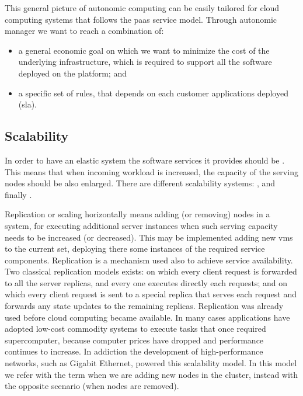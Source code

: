 This general picture of autonomic computing can be easily tailored for cloud computing systems that
follows the \ac{paas} service model. Through autonomic manager we want to reach a combination of:

\begin{itemize}
	\item{a general economic goal on which we want to minimize the cost of the underlying infrastructure,
		which is required to support all the software deployed on the platform; and}
	\item{a specific set of rules, that depends on each customer applications deployed (\ac{sla}).}
\end{itemize}

\subsection{Scalability}
\label{sec:elasticity-requirements-scalability}
In order to have an elastic system the software services it provides should be . This
means that when incoming workload is increased, the capacity of the serving nodes should be also
enlarged. There are different scalability systems: ,  and
finally .

Replication or scaling horizontally means adding (or removing) nodes in a system, for executing additional
server instances when such serving capacity needs to be increased (or decreased). This may be implemented
adding new \ac{vm}s to the current set, deploying there some instances of the required service components.
Replication is a mechanism used also to achieve service availability. Two classical replication models
exists:  on which every client request is forwarded to all the server replicas,
and every one executes directly each requests; and  on which every client request
is sent to a special replica that serves each request and forwards any state updates to the remaining replicas.
Replication was already used before cloud computing became available. In many cases applications have adopted
low-cost commodity systems to execute tasks that once required supercomputer, because computer prices have
dropped and performance continues to increase. In addiction the development of high-performance networks,
such as Gigabit Ethernet, powered this scalability model. In this model we refer with the term
 when we are adding new nodes in the cluster, instead with  the opposite
scenario (when nodes are removed).

